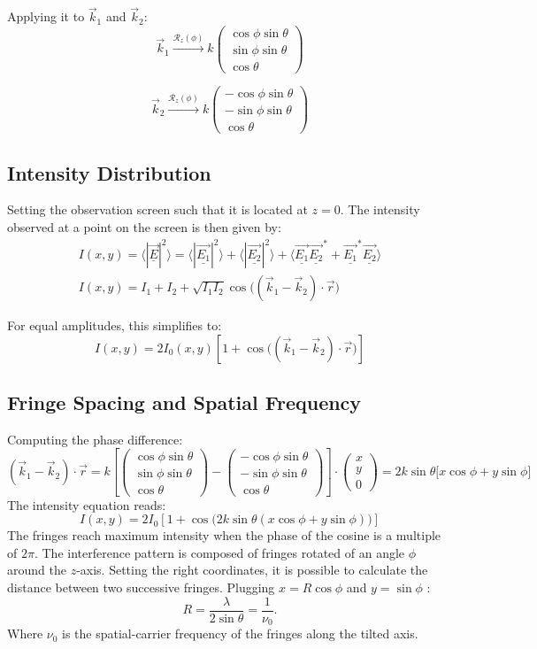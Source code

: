 \documentclass[11pt,a4paper]{article}
\newcommand{\vectIII}[3]{%
    \begin{pmatrix}
    #1 \\
    #2 \\
    #3
    \end{pmatrix}%
}
\begin{document}
Applying it to $\vec{k}_1$ and $\vec{k}_2$:
$$
\vec{k}_1 \xrightarrow{\mathcal{R}_z(\phi)} k \vectIII{\cos{\phi}\sin{\theta}}{\sin{\phi}\sin{\theta}}{\cos{\theta}}
$$

$$
\vec{k}_2 \xrightarrow{\mathcal{R}_z(\phi)} k \vectIII{-\cos{\phi}\sin{\theta}}{-\sin{\phi}\sin{\theta}}{\cos{\theta}}
$$

\subsection{Intensity Distribution}
Setting the observation screen such that it is located at $z = 0$.
The intensity observed at a point on the screen is then given by:
\begin{align}
I(x,y) = \big\langle|\vec{\underline{E}}|^2\big\rangle = \big\langle|\vec{\underline{E_1}}|^2\big\rangle + \big\langle|\vec{\underline{E_2}}|^2\big\rangle + \big\langle \vec{\underline{E_1}}\vec{\underline{E_2}}^* +\vec{\underline{E_1}}^*\vec{\underline{E_2}} \big\rangle\\
I(x,y) = I_1 + I_2 + \sqrt{I_1I_2} \cos\big((\vec{k}_1 - \vec{k}_2) \cdot \vec{r}\big)
\end{align}

For equal amplitudes, this simplifies to:
\begin{equation}
I(x,y) = 2I_0(x,y)\left[1 + \cos\big((\vec{k}_1 - \vec{k}_2) \cdot \vec{r}\big)\right]
\end{equation}

\subsection{Fringe Spacing and Spatial Frequency}

Computing the phase difference:
\begin{equation}
(\vec{k}_1 - \vec{k}_2) \cdot \vec{r} = k \left[ \vectIII{\cos{\phi}\sin{\theta}}{\sin{\phi}\sin{\theta}}{\cos{\theta}}-\vectIII{-\cos{\phi}\sin{\theta}}{-\sin{\phi}\sin{\theta}}{\cos{\theta}}\right] \cdot \vectIII{x}{y}{0} = 2k\sin{\theta}\bigg[x\cos{\phi}+y\sin{\phi}\bigg]
\end{equation}
The intensity equation reads: 
\begin{equation}
I(x,y) = 2I_0\left[1 + \cos\!\big(2k\sin{\theta}(x\cos\phi + y\sin\phi)\big)\right]
\end{equation}
The fringes reach maximum intensity when the phase of the cosine is a multiple of $2\pi$.
The interference pattern is composed of fringes rotated of an angle $\phi$ around the $z$-axis. Setting the right coordinates, it is possible to calculate the distance between two successive fringes. Plugging $ x=R\cos{\phi}$ and $y=\sin{\phi}$ : 
\begin{equation}
R = \frac{\lambda}{2\sin\theta} = \frac{1}{\nu_0}.
\end{equation}
Where $\nu_0$ is the spatial-carrier frequency of the fringes along the tilted axis.
\end{document}
